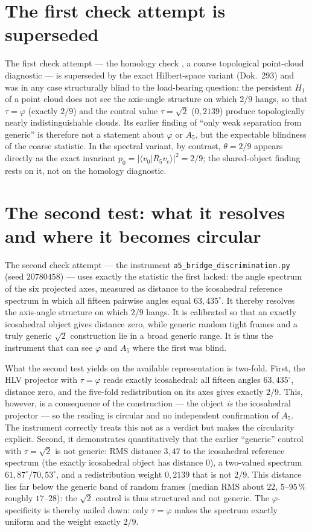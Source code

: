 \section{The first check attempt is superseded}
The first check attempt --- the homology check , a
coarse topological point-cloud diagnostic --- is superseded by the exact Hilbert-space variant
(Dok.~293) and was in any case structurally blind to the load-bearing question: the persistent
$H_1$ of a point cloud does not see the axis-angle structure on which $2/9$ hangs, so that
$\tau=\varphi$ (exactly $2/9$) and the control value $\tau=\sqrt2$ ($0{,}2139$) produce
topologically nearly indistinguishable clouds. Its earlier finding of \enquote{only weak
separation from generic} is therefore not a statement about $\varphi$ or $A_5$, but the
expectable blindness of the coarse statistic. In the spectral variant, by contrast, $\theta=2/9$
appears directly as the exact invariant $p_0=\lvert\langle v_0|R_5 v_e\rangle\rvert^2=2/9$; the
shared-object finding rests on it, not on the homology diagnostic.

\section{The second test: what it resolves and where it becomes circular}
The second check attempt --- the instrument \texttt{a5\_bridge\_discrimination.py} (seed
$20780458$) --- uses exactly the statistic the first lacked: the angle spectrum of the six
projected axes, measured as distance to the icosahedral reference spectrum in which all fifteen
pairwise angles equal $63{,}435^\circ$. It thereby resolves the axis-angle structure on which
$2/9$ hangs. It is calibrated so that an exactly icosahedral object gives distance zero, while
generic random tight frames and a truly generic $\sqrt2$ construction lie in a broad generic
range. It is thus the instrument that can see $\varphi$ and $A_5$ where the first was blind.

What the second test yields on the available representation is two-fold. First, the HLV projector
with $\tau=\varphi$ reads exactly icosahedral: all fifteen angles $63{,}435^\circ$, distance zero,
and the five-fold redistribution on its axes gives exactly $2/9$. This, however, is a consequence
of the construction --- the object \emph{is} the icosahedral projector --- so the reading is
circular and no independent confirmation of $A_5$. The instrument correctly treats this not as a
verdict but makes the circularity explicit. Second, it demonstrates quantitatively that the
earlier \enquote{generic} control with $\tau=\sqrt2$ is not generic: RMS distance $3{,}47$ to the
icosahedral reference spectrum (the exactly icosahedral object has distance $0$), a two-valued
spectrum $61{,}87^\circ/70{,}53^\circ$, and a redistribution weight $0{,}2139$ that is not $2/9$.
This distance lies far below the generic band of random frames (median RMS about $22$,
$5$--$95\,\%$ roughly $17$--$28$): the $\sqrt2$ control is thus structured and not generic. The
$\varphi$-specificity is thereby nailed down: only $\tau=\varphi$ makes the spectrum exactly
uniform and the weight exactly $2/9$.

